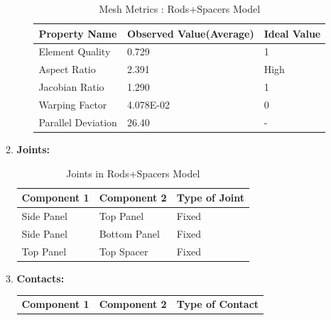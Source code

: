 \documentclass[../../main.tex]{subfiles}
\begin{document}
\begin{enumerate}
\begin{enumerate}
\begin{enumerate}
\begin{table}[h!]
\begin{tabular}{|p{4cm}|p{3cm}|p{3cm}|}
                    \hline
                    \textbf{Property Name} & \textbf{Observed Value(Average)} & \textbf{Ideal Value} \\
                    \hline
                  Element Quality & 0.729 & 1 \\
                  \hline
                  Aspect Ratio & 2.391 & High \\
                  \hline
                  Jacobian Ratio & 1.290 & 1 \\
                  \hline
                  Warping Factor & 4.078E-02 & 0 \\
                  \hline
                Parallel Deviation & 26.40 & - \\

                   \hline
                \end{tabular}
                \caption{Mesh Metrics : Rods+Spacers Model}
                \label{tab:my_label}
            \end{table}
            \end{enumerate}
            \item \textbf{Joints: }
            \begin{table}[h!]
                \centering
                \begin{tabular}{|p{4cm}|p{3cm}|p{3cm}|}
                    \hline
                    \textbf{Component 1} & \textbf{Component 2} & \textbf{Type of Joint} \\
                    \hline
                   Side Panel & Top Panel & Fixed  \\
                    \hline
                    Side Panel & Bottom Panel & Fixed \\
                    \hline
                    Top Panel & Top Spacer & Fixed \\
                   \hline
                \end{tabular}
                \caption{Joints in Rods+Spacers Model}
                \label{tab:my_label}
            \end{table}
            \item \textbf{Contacts: }
            \begin{table}[h!]
                \centering
                            \begin{tabular}{|p{4cm}|p{3cm}|p{3cm}|}
                    \hline
                    \textbf{Component 1} & \textbf{Component 2} & \textbf{Type of Contact} \\

\end{tabular}
\end{table}
\end{enumerate}
\end{enumerate}
\end{document}
